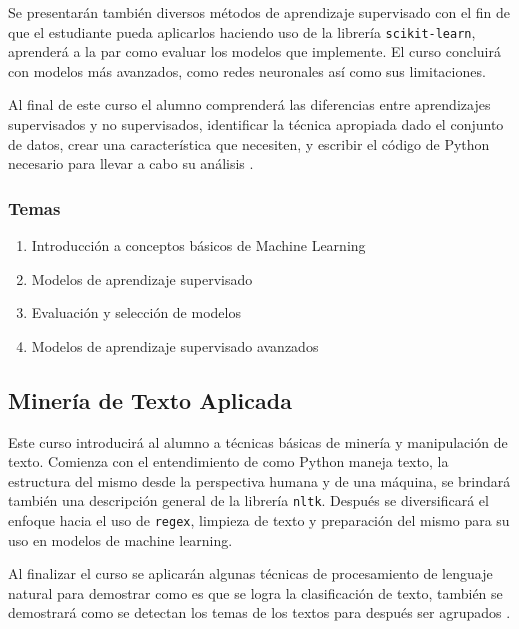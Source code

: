 \documentclass{article}
\begin{document}
            Se presentarán también diversos métodos de aprendizaje supervisado con el fin de que el estudiante pueda aplicarlos haciendo uso de la librería \texttt{scikit-learn}, aprenderá a la par como evaluar los modelos que implemente. El curso concluirá con modelos más avanzados, como redes neuronales así como sus limitaciones.

            Al final de este curso el alumno comprenderá las diferencias entre aprendizajes supervisados y no supervisados, identificar la técnica apropiada dado el conjunto de datos, crear una característica que necesiten, y escribir el código de Python necesario para llevar a cabo su análisis \cite{applied-ml}.

            \subsubsection{Temas}

                \begin{enumerate}
                    \item Introducción a conceptos básicos de Machine Learning
                    \item Modelos de aprendizaje supervisado
                    \item Evaluación y selección de modelos
                    \item Modelos de aprendizaje supervisado avanzados
                \end{enumerate}

        \subsection{Minería de Texto Aplicada}

            Este curso introducirá al alumno a técnicas básicas de minería y manipulación de texto. Comienza con el entendimiento de como Python maneja texto, la estructura del mismo desde la perspectiva humana y de una máquina, se brindará también una descripción general de la librería \texttt{nltk}. Después se diversificará el enfoque hacia el uso de \texttt{regex}, limpieza de texto y preparación del mismo para su uso en modelos de machine learning.

            Al finalizar el curso se aplicarán algunas técnicas de procesamiento de lenguaje natural para demostrar como es que se logra la clasificación de texto, también se demostrará como se detectan los temas de los textos para después ser agrupados \cite{text-mining}.
\end{document}
